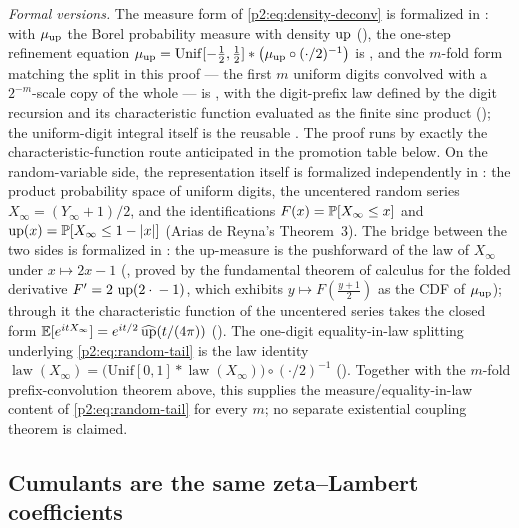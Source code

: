 \documentclass[11pt,oneside]{article}
\numberwithin{equation}{section}
\theoremstyle{definition}
\theoremstyle{remark}
\begin{document}
\emph{Formal versions.}  The measure form of \eqref{p2:eq:density-deconv} is formalized in
: with $\mu_{\operatorname{up}}$ the Borel probability measure with density
$\operatorname{up}$ (), the one-step refinement equation
$\mu_{\operatorname{up}}=\mathrm{Unif}[-\tfrac12,\tfrac12]\ast\bigl(\mu_{\operatorname{up}}\circ(\cdot/2)^{-1}\bigr)$ is
, and the $m$-fold form matching the split in this
proof --- the first $m$ uniform digits convolved with a $2^{-m}$-scale copy of the whole ---
is , with the digit-prefix law
 defined by the digit recursion and its characteristic
function evaluated as the finite sinc product
(); the uniform-digit integral itself is the
reusable .  The proof runs by exactly the
characteristic-function route anticipated in the promotion table below.  On the
random-variable side, the representation itself is formalized independently in
: the product probability space of uniform digits,
the uncentered random series \(X_\infty=(Y_\infty+1)/2\), and the identifications
\(F(x)=\mathbb P[X_\infty\le x]\) and \(\operatorname{up}(x)=\mathbb P[X_\infty\le1-|x|]\) (Arias de Reyna's
Theorem~3).  The
bridge between the two sides is formalized in : the up-measure
is the pushforward of the law of \(X_\infty\) under \(x\mapsto2x-1\)
(, proved by the fundamental theorem
of calculus for the folded derivative \(F'=2\,\operatorname{up}(2\cdot{}-1)\), which exhibits
\(y\mapsto F(\tfrac{y+1}{2})\) as the CDF of \(\mu_{\operatorname{up}}\)); through it the characteristic
function of the uncentered series takes the closed form
\(\mathbb{E}[e^{itX_\infty}]=e^{it/2}\,\widehat{\operatorname{up}}(t/(4\pi))\)
().  The one-digit equality-in-law
splitting underlying \eqref{p2:eq:random-tail} is the law identity
\(\operatorname{law}(X_\infty)
 =\bigl(\mathrm{Unif}[0,1]\ast\operatorname{law}(X_\infty)\bigr)\circ(\cdot/2)^{-1}\)
().  Together with the
\(m\)-fold prefix-convolution theorem above, this supplies the measure/equality-in-law
content of \eqref{p2:eq:random-tail} for every \(m\); no separate existential coupling
theorem is claimed.

\subsection{Cumulants are the same zeta--Lambert coefficients}
\end{document}
